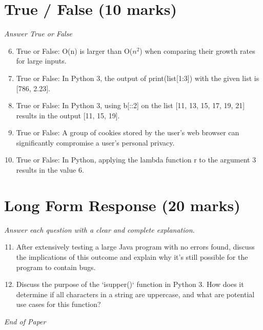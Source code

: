 \documentclass[12pt]{article}
\begin{document}
\section*{True / False (10 marks)}
\textit{Answer True or False}
\begin{enumerate}[label=\arabic*.]
\setcounter{enumi}{5}
\item True or False: O(n) is larger than O($n^2$) when comparing their growth rates for large inputs.
\item True or False: In Python 3, the output of print(list[1:3]) with the given list is [786, 2.23].
\item True or False: In Python 3, using b[::2] on the list [11, 13, 15, 17, 19, 21] results in the output [11, 15, 19].
\item True or False: A group of cookies stored by the user's web browser can significantly compromise a user's personal privacy.
\item True or False: In Python, applying the lambda function r to the argument 3 results in the value 6.
\end{enumerate}

\section*{Long Form Response (20 marks)}
\textit{Answer each question with a clear and complete explanation.}
\begin{enumerate}[label=\arabic*.]
\setcounter{enumi}{10}
\item After extensively testing a large Java program with no errors found, discuss the implications of this outcome and explain why it's still possible for the program to contain bugs.
\item Discuss the purpose of the `isupper()` function in Python 3. How does it determine if all characters in a string are uppercase, and what are potential use cases for this function?
\end{enumerate}

\vfill
\noindent\textit{End of Paper}
\end{document}
